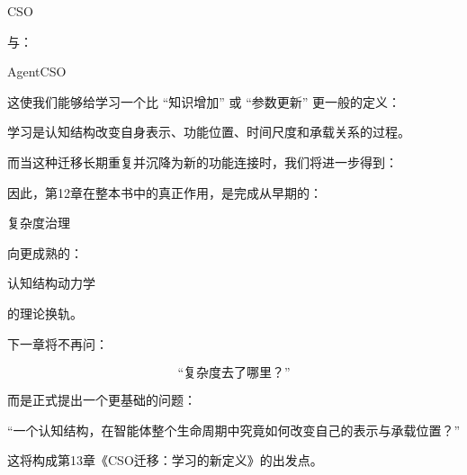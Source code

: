 \begin{statementbox}
CSO
\end{statementbox}

与：

\begin{statementbox}
AgentCSO
\end{statementbox}

这使我们能够给学习一个比 ``知识增加'' 或 ``参数更新'' 更一般的定义：

\begin{definition*}
学习是认知结构改变自身表示、功能位置、时间尺度和承载关系的过程。
\end{definition*}

而当这种迁移长期重复并沉降为新的功能连接时，我们将进一步得到：

\begin{statementbox}
\centering
{}
\end{statementbox}

因此，第12章在整本书中的真正作用，是完成从早期的：

\begin{statementbox}
复杂度治理
\end{statementbox}

向更成熟的：

\begin{statementbox}
认知结构动力学
\end{statementbox}

的理论换轨。

下一章将不再问：

\[
\text{``复杂度去了哪里？''}
\]

而是正式提出一个更基础的问题：

\begin{statementbox}
``一个认知结构，在智能体整个生命周期中究竟如何改变自己的表示与承载位置？''
\end{statementbox}

这将构成第13章《CSO迁移：学习的新定义》的出发点。
